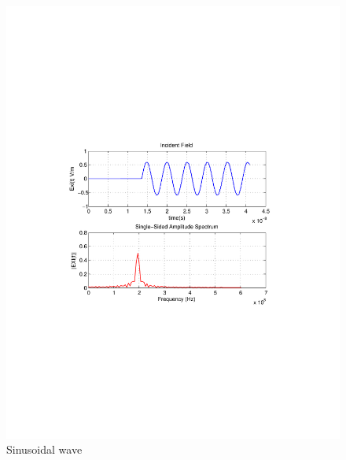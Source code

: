 \begin{figure}[H]
\centering
\includegraphics[scale=0.8, trim=3.5cm 8.7cm 4.5cm 8.85cm, clip]{FigCh03_IncidentFieldSinusoidal.pdf}
\caption{Sinusoidal wave}
\label{1DDNG-IncidentField-Sinusoidal}
\end{figure}
